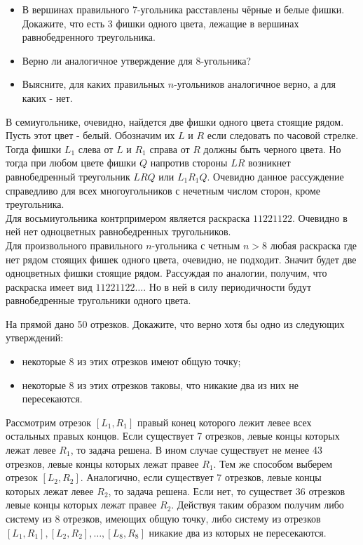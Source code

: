 \documentclass[11pt, a4paper]{template}
\begin{document}
\begin{exercise}[M146]
\begin{itemize}
\item В вершинах правильного 7-угольника расставлены чёрные и белые фишки. Докажите, что есть 3 фишки одного цвета, лежащие в вершинах равнобедренного треугольника.
\item Верно ли аналогичное утверждение для 8-угольника?
\item Выясните, для каких правильных $n$-угольников аналогичное верно, а для каких - нет.
\end{itemize}
\end{exercise}

\begin{solution}
В семиугольнике, очевидно, найдется две фишки одного цвета стоящие рядом. Пусть этот цвет - белый. Обозначим их $L$ и $R$ если следовать по часовой стрелке. Тогда фишки $L_{1}$ слева от $L$ и $R_{1}$ справа от $R$ должны быть черного цвета. Но тогда при любом цвете фишки $Q$ напротив стороны $LR$  возникнет равнобедренный треугольник $LRQ$ или $L_{1}R_{1}Q$. Очевидно данное рассуждение справедливо для всех многоугольников с нечетным числом сторон, кроме треугольника. \\
Для восьмиугольника контрпримером является раскраска $11221122$. Очевидно в ней нет одноцветных равнобедренных тругольников. \\
Для произвольного правильного $n$-угольника с четным $n > 8$ любая раскраска где нет рядом стоящих фишек одного цвета, очевидно, не подходит. Значит будет две одноцветных фишки стоящие рядом. Рассуждая по аналогии, получим, что раскраска имеет вид $11221122\dots$. Но в ней в силу периодичности будут равнобедренные тругольники одного цвета.
\end{solution}

\begin{exercise}[M154]
На прямой дано 50 отрезков. Докажите, что верно хотя бы одно из следующих
утверждений:
\begin{itemize}
\item некоторые 8 из этих отрезков имеют общую точку;
\item некоторые 8 из этих отрезков таковы, что никакие два из них не пересекаются.
\end{itemize}
\end{exercise}

\begin{solution}
Рассмотрим отрезок $[L_{1}, R_{1}]$ правый конец которого лежит левее всех остальных правых концов. Если существует 7 отрезков, левые концы которых лежат левее $R_{1}$, то задача решена. В ином случае существует не менее 43 отрезков, левые концы которых лежат правее $R_{1}$. Тем же способом выберем отрезок $[L_{2}, R_{2}]$. Аналогично, если существует 7 отрезков, левые концы которых лежат левее $R_{2}$, то задача решена. Если нет, то существет 36 отрезков левые концы которых лежат правее $R_{2}$. Действуя таким образом получим либо систему из 8 отрезков, имеющих общую точку, либо систему из отрезков $[L_{1}, R_{1}], [L_{2}, R_{2}], \dots, [L_{8}, R_{8}]$ никакие два из которых не пересекаются. 
\end{solution}
\end{document}
